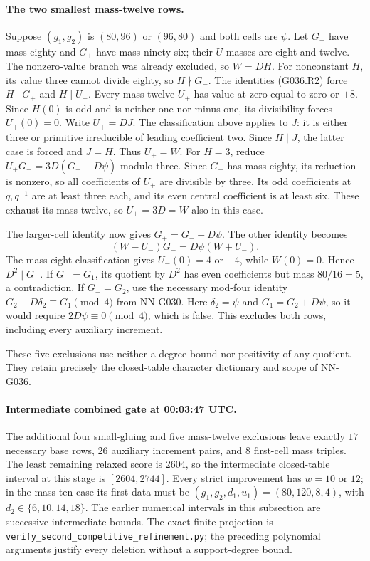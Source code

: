 \paragraph{The two smallest mass-twelve rows.}
Suppose $(g_1,g_2)$ is $(80,96)$ or $(96,80)$ and both
cells are $\psi$. Let $G_-$ have mass eighty and $G_+$
have mass ninety-six; their $U$-masses are eight and twelve.
The nonzero-value branch was already excluded, so $W=DH$.
For nonconstant $H$, its value three cannot divide eighty,
so $H\nmid G_-$. The identities (G036.R2) force
$H\mid G_+$ and $H\mid U_+$. Every mass-twelve $U_+$
has value at zero equal to zero or $\pm8$. Since $H(0)$ is
odd and is neither one nor minus one, its divisibility
forces $U_+(0)=0$. Write $U_+=DJ$. The classification above
applies to $J$: it is either three or primitive irreducible
of leading coefficient two. Since $H\mid J$, the latter
case is forced and $J=H$. Thus $U_+=W$.
For $H=3$, reduce $U_+G_-=3D(G_+-D\psi)$ modulo three.
Since $G_-$ has mass eighty, its reduction is nonzero, so
all coefficients of $U_+$ are divisible by three. Its odd
coefficients at $q,q^{-1}$ are at least three each, and its
even central coefficient is at least six. These exhaust its
mass twelve, so $U_+=3D=W$ also in this case.

The larger-cell identity now gives $G_+=G_-+D\psi$.
The other identity becomes
\[
             (W-U_-)G_-=D\psi(W+U_-).
\]
The mass-eight classification gives $U_-(0)=4$ or $-4$,
while $W(0)=0$. Hence $D^2\mid G_-$.
If $G_-=G_1$, its quotient by $D^2$ has even coefficients
but mass $80/16=5$, a contradiction.
If $G_-=G_2$, use the necessary mod-four identity
$G_2-D\delta_2\equiv G_1\pmod4$ from NN-G030.
Here $\delta_2=\psi$ and $G_1=G_2+D\psi$, so it would
require $2D\psi\equiv0\pmod4$, which is false.
This excludes both rows, including every auxiliary increment.

These five exclusions use neither a degree bound nor
positivity of any quotient. They retain precisely the
closed-table character dictionary and scope of NN-G036.

\paragraph{Intermediate combined gate at 00:03:47 UTC.}
The additional four small-gluing and five mass-twelve exclusions
leave exactly $17$ necessary base rows, $26$ auxiliary increment
pairs, and $8$ first-cell mass triples. The least remaining
relaxed score is $2604$, so the intermediate closed-table
interval at this stage is $[2604,2744]$. Every strict improvement has $w=10$
or $12$; in the mass-ten case its first data must be
$(g_1,g_2,d_1,u_1)=(80,120,8,4)$, with
$d_2\in\{6,10,14,18\}$. The earlier numerical intervals in
this subsection are successive intermediate bounds.
The exact finite projection is
\texttt{verify\_second\_competitive\_refinement.py};
the preceding polynomial arguments justify every deletion
without a support-degree bound.


